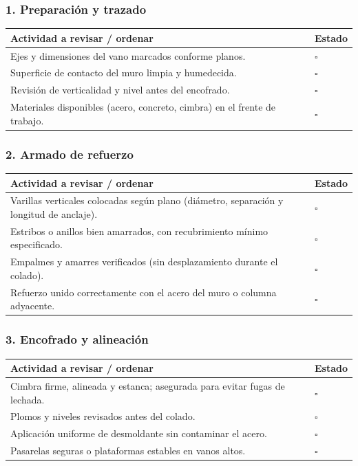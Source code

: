 \documentclass[12pt]{article}
\newcommand{\cbox}{\(\square\)}
\renewcommand{\cbox}{\(\square\)} %
\begin{document}
	\subsubsection*{1. Preparación y trazado}
	\begin{tabularx}{\linewidth}{>{\raggedright\arraybackslash}p{0.93\linewidth} >{\centering\arraybackslash}m{0.07\linewidth}}
		\toprule
		\textbf{Actividad a revisar / ordenar} & \textbf{Estado}\\
		\midrule
		Ejes y dimensiones del vano marcados conforme planos. & \cbox \\
		Superficie de contacto del muro limpia y humedecida. & \cbox \\
		Revisión de verticalidad y nivel antes del encofrado. & \cbox \\
		Materiales disponibles (acero, concreto, cimbra) en el frente de trabajo. & \cbox \\
		\bottomrule
	\end{tabularx}
	
	\subsubsection*{2. Armado de refuerzo}
	\begin{tabularx}{\linewidth}{>{\raggedright\arraybackslash}p{0.93\linewidth} >{\centering\arraybackslash}m{0.07\linewidth}}
		\toprule
		\textbf{Actividad a revisar / ordenar} & \textbf{Estado}\\
		\midrule
		Varillas verticales colocadas según plano (diámetro, separación y longitud de anclaje). & \cbox \\
		Estribos o anillos bien amarrados, con recubrimiento mínimo especificado. & \cbox \\
		Empalmes y amarres verificados (sin desplazamiento durante el colado). & \cbox \\
		Refuerzo unido correctamente con el acero del muro o columna adyacente. & \cbox \\
		\bottomrule
	\end{tabularx}
	
	\subsubsection*{3. Encofrado y alineación}
	\begin{tabularx}{\linewidth}{>{\raggedright\arraybackslash}p{0.93\linewidth} >{\centering\arraybackslash}m{0.07\linewidth}}
		\toprule
		\textbf{Actividad a revisar / ordenar} & \textbf{Estado}\\
		\midrule
		Cimbra firme, alineada y estanca; asegurada para evitar fugas de lechada. & \cbox \\
		Plomos y niveles revisados antes del colado. & \cbox \\
		Aplicación uniforme de desmoldante sin contaminar el acero. & \cbox \\
		Pasarelas seguras o plataformas estables en vanos altos. & \cbox \\
		\bottomrule
	\end{tabularx}
	
\end{document}
